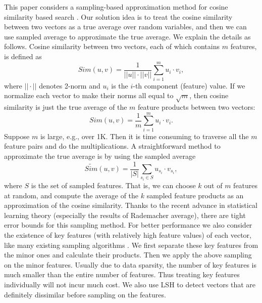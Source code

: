 \documentclass{article}
\begin{document}
This paper considers a sampling-based approximation method for cosine similarity based search \cite{SGM00,Xia16,ATY13,TAJY14}. Our solution idea is to treat the cosine similarity between two vectors as a true average over random variables, and then we can use sampled average to approximate the true average. We explain the details as follows.
Cosine similarity between two vectors, each of which contains $m$ features, is defined as
$$Sim(u,v) = \frac{1}{||u||\cdot||v||} \sum_{i=1}^m u_i\cdot v_i,$$
where $||\cdot||$ denotes 2-norm and $u_i$ is the $i$-th component (feature) value. If we normalize each vector to make their norms all equal to $\sqrt{m}$, then cosine similarity is just the true average of the $m$ feature products between two vectors:
$$Sim(u,v) = \frac{1}{m} \sum_{i=1}^m u_i\cdot v_i.$$
Suppose $m$ is large, e.g., over 1K. Then it is time consuming to traverse all the $m$ feature pairs and do the multiplications. A straightforward method to approximate the true average is by using the sampled average
$$\widetilde{Sim}(u,v) = \frac{1}{|S|} \sum_{s_i\in S} u_{s_i}\cdot v_{s_i},$$
where $S$ is the set of sampled features. 
That is, we can choose $k$ out of $m$ features at random, and compute the average of the $k$ sampled feature products as an approximation of the cosine similarity.
Thanks to the recent advance in statistical learning theory (especially the results of Rademacher average), there are tight error bounds for this sampling method.
For better performance we also consider the existence of key features (with relatively high feature values) of each vector, like many existing sampling algorithms \cite{CL99,BKP15}. We first separate these key features from the minor ones and calculate their products. Then we apply the above sampling on the minor features. Usually due to data sparsity, the number of key features is much smaller than the entire number of features. Thus treating key features individually will not incur much cost. We also use LSH to detect vectors that are definitely dissimilar before sampling on the features.
\end{document}
